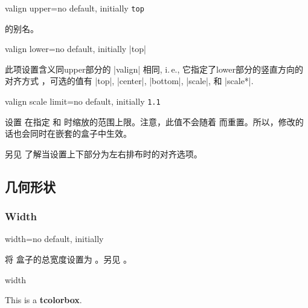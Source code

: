   




\begin{docTcbKey}[][doc new=2015-05-07]{valign upper}{=}{no default, initially \texttt{top}}

 的别名。
\end{docTcbKey}

\begin{docTcbKey}{valign lower}{=}{no default, initially |top|}

此项设置含义同upper部分的 |valign| 相同, i.\,e., 它指定了lower部分的竖直方向的对齐方式  ，可选的值有 |top|, |center|, |bottom|, |scale|, 和 |scale*|.

\end{docTcbKey}

\begin{docTcbKey}[][doc new=2015-07-16]{valign scale limit}{=}{no default, initially \texttt{1.1}}

设置  在指定  和  时缩放的范围上限。注意，此值不会随着  而重置。所以，修改的话也会同时在嵌套的盒子中生效。
\end{docTcbKey}


另见  了解当设置上下部分为左右排布时的对齐选项。






\subsection{几何形状}
\subsubsection{Width}

\begin{docTcbKey}{width}{=}{no default, initially }

将%
盒子的总宽度设置为 。另见 。
\begin{exdispExample}{width} 

\begin{tcolorbox}[width=\linewidth/2]
This is a \textbf{tcolorbox}.
\end{tcolorbox}
\end{exdispExample}
\end{docTcbKey}


